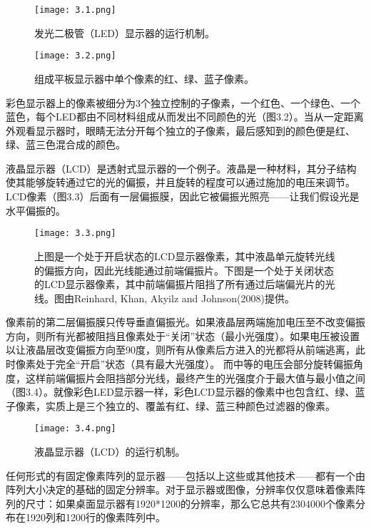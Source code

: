 \documentclass[lang=cn,12pt]{elegantbook}
\begin{document}
\begin{figure}[htb]
\centering
\begin{minipage}[t]{0.45\textwidth}
\centering
\texttt{[image: 3.1.png]}
\caption{发光二极管（LED）显示器的运行机制。}
\end{minipage}
\begin{minipage}[t]{0.45\textwidth}
\centering
\texttt{[image: 3.2.png]}
\caption{组成平板显示器中单个像素的红、绿、蓝子像素。}
\end{minipage}
\end{figure}

彩色显示器上的像素被细分为3个独立控制的子像素，一个红色、一个绿色、一个蓝色，每个LED都由不同材料组成从而发出不同颜色的光（图3.2）。当从一定距离外观看显示器时，眼睛无法分开每个独立的子像素，最后感知到的颜色便是红、绿、蓝三色混合成的颜色。

液晶显示器（LCD）是透射式显示器的一个例子。液晶是一种材料，其分子结构使其能够旋转通过它的光的偏振，并且旋转的程度可以通过施加的电压来调节。LCD像素（图3.3）后面有一层偏振膜，因此它被偏振光照亮——让我们假设光是水平偏振的。

\begin{figure}[htb]
\centering
\texttt{[image: 3.3.png]}
\caption{上图是一个处于开启状态的LCD显示器像素，其中液晶单元旋转光线的偏振方向，因此光线能通过前端偏振片。下图是一个处于关闭状态的LCD显示器像素，其中前端偏振片阻挡了所有通过后端偏光片的光线。图由Reinhard, Khan, Akyilz and Johnson(2008)提供。}
\end{figure}

像素前的第二层偏振膜只传导垂直偏振光。如果液晶层两端施加电压至不改变偏振方向，则所有光都被阻挡且像素处于“关闭”状态（最小光强度）。如果电压被设置以让液晶层改变偏振方向至90度，则所有从像素后方进入的光都将从前端逃离，此时像素处于完全“开启”状态（具有最大光强度）。 而中等的电压会部分旋转偏振角度，这样前端偏振片会阻挡部分光线，最终产生的光强度介于最大值与最小值之间（图3.4）。就像彩色LED显示器一样，彩色LCD显示器的像素中也包含红、绿、蓝子像素，实质上是三个独立的、覆盖有红、绿、蓝三种颜色过滤器的像素。

\begin{figure}[htb]
\centering
\texttt{[image: 3.4.png]}
\caption{液晶显示器（LCD）的运行机制。}
\end{figure}

任何形式的有固定像素阵列的显示器——包括以上这些或其他技术——都有一个由阵列大小决定的基础的固定分辨率。对于显示器或图像，分辨率仅仅意味着像素阵列的尺寸：如果桌面显示器有1920*1200的分辨率，那么它总共有2304000个像素分布在1920列和1200行的像素阵列中。
\end{document}

